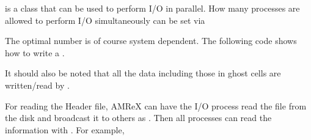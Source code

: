 \documentclass[letterpaper,10pt,english]{sphinxmanual}
\begin{document}
\sphinxAtStartPar
{} is a class that can be used to perform
 I/O in parallel. How many processes are allowed to
perform I/O simultaneously can be set via

\begin{sphinxVerbatim}[commandchars=\\\{\}]
  
\end{sphinxVerbatim}

\sphinxAtStartPar
The optimal number is of course system dependent. The following code
shows how to write a .

\begin{sphinxVerbatim}[commandchars=\\\{\}]
         
    \PYG{p}{[}\PYG{p}{]}
                    
\end{sphinxVerbatim}

\sphinxAtStartPar
It should also be noted that all the
data including those in ghost cells are written/read by
.

\sphinxAtStartPar
For reading the Header file, AMReX can have the I/O process
read the file from the disk and broadcast it to others as
. Then all processes can read the information with
. For example,
\end{document}
